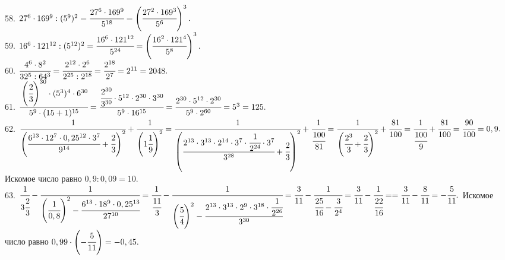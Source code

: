 \documentclass[12pt]{article}
\begin{document}
58. $27^6\cdot169^9:(5^9)^2=\cfrac{27^6\cdot169^9}{5^{18}}=\left(\cfrac{27^2\cdot169^3}{5^6}\right)^3.$\\
59. $16^6\cdot121^{12}:(5^{12})^2=\cfrac{16^6\cdot121^{12}}{5^{24}}=\left(\cfrac{16^2\cdot121^4}{5^8}\right)^3.$\\
60. $\cfrac{4^6\cdot 8^2}{32^5:64^3}=\cfrac{2^{12}\cdot 2^6}{2^{25}:2^{18}}=\cfrac{2^{18}}{2^7}=2^{11}=2048.$\\
61. $\cfrac{\left(\cfrac{2}{3}\right)^{30}\cdot(5^3)^4\cdot6^{30}}{5^9\cdot(15+1)^{15}}=\cfrac{\cfrac{2^{30}}{3^{30}}\cdot5^{12}\cdot2^{30}\cdot3^{30}}{5^9\cdot16^{15}}=
\cfrac{2^{30}\cdot5^{12}\cdot2^{30}}{5^9\cdot2^{60}}=5^3=125.$\\
62. $\cfrac{1}{\left(\cfrac{6^{13}\cdot12^7\cdot0,25^{12}\cdot3^7}{9^{14}}+\cfrac{2}{3}\right)^2}+\cfrac{1}{\left(1\cfrac{1}{9}\right)^2}=
\cfrac{1}{\left(\cfrac{2^{13}\cdot3^{13}\cdot2^{14}\cdot3^7\cdot\cfrac{1}{2^{24}}\cdot3^7}{3^{28}}+\cfrac{2}{3}\right)^2}+\cfrac{1}{\cfrac{100}{81}}=
\cfrac{1}{\left(\cfrac{2^3}{3}+\cfrac{2}{3}\right)^2}+\cfrac{81}{100}=
\cfrac{1}{\cfrac{100}{9}}+\cfrac{81}{100}=\cfrac{90}{100}=0,9.$
Искомое число равно $0,9:0,09=10.$\\
63. $\cfrac{1}{3\cfrac{2}{3}}-\cfrac{1}{\left(\cfrac{1}{0,8}\right)^2-\cfrac{6^{13}\cdot18^9\cdot0,25^{13}}{27^{10}}}=
\cfrac{1}{\cfrac{11}{3}}-\cfrac{1}{\left(\cfrac{5}{4}\right)^2-\cfrac{2^{13}\cdot3^{13}\cdot2^9\cdot3^{18}\cdot\cfrac{1}{2^{26}}}{3^{30}}}=
\cfrac{3}{11}-\cfrac{1}{\cfrac{25}{16}-\cfrac{3}{2^4}}=\cfrac{3}{11}-\cfrac{1}{\cfrac{22}{16}}=
=\cfrac{3}{11}-\cfrac{8}{11}=-\cfrac{5}{11}.$
Искомое число равно $0,99\cdot\left(-\cfrac{5}{11}\right)=-0,45.$
\newpage
\end{document}
